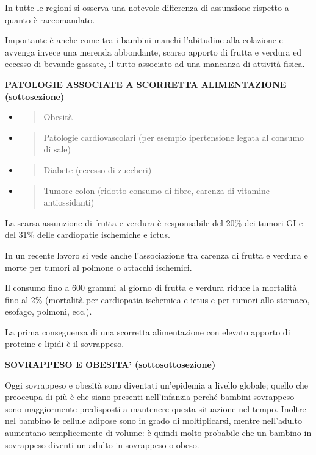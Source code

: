 \documentclass[]{article}
\begin{document}
In tutte le regioni si osserva una notevole differenza di assunzione
rispetto a quanto è raccomandato.

Importante è anche come tra i bambini manchi l'abitudine alla colazione
e avvenga invece una merenda abbondante, scarso apporto di frutta e
verdura ed eccesso di bevande gassate, il tutto associato ad una
mancanza di attività fisica.

\textbf{PATOLOGIE ASSOCIATE A SCORRETTA ALIMENTAZIONE (sottosezione)}

\begin{itemize}
\item
  \begin{quote}
  Obesità
  \end{quote}
\item
  \begin{quote}
  Patologie cardiovascolari (per esempio ipertensione legata al consumo
  di sale)
  \end{quote}
\item
  \begin{quote}
  Diabete (eccesso di zuccheri)
  \end{quote}
\item
  \begin{quote}
  Tumore colon (ridotto consumo di fibre, carenza di vitamine
  antiossidanti)
  \end{quote}
\end{itemize}

La scarsa assunzione di frutta e verdura è responsabile del 20\% dei
tumori GI e del 31\% delle cardiopatie ischemiche e ictus.

In un recente lavoro si vede anche l'associazione tra carenza di frutta
e verdura e morte per tumori al polmone o attacchi ischemici.

Il consumo fino a 600 grammi al giorno di frutta e verdura riduce la
mortalità fino al 2\% (mortalità per cardiopatia ischemica e ictus e per
tumori allo stomaco, esofago, polmoni, ecc.).

La prima conseguenza di una scorretta alimentazione con elevato apporto
di proteine e lipidi è il sovrappeso.

\textbf{SOVRAPPESO E OBESITA' (sottosottosezione)}

Oggi sovrappeso e obesità sono diventati un'epidemia a livello globale;
quello che preoccupa di più è che siano presenti nell'infanzia perché
bambini sovrappeso sono maggiormente predisposti a mantenere questa
situazione nel tempo. Inoltre nel bambino le cellule adipose sono in
grado di moltiplicarsi, mentre nell'adulto aumentano semplicemente di
volume: è quindi molto probabile che un bambino in sovrappeso diventi un
adulto in sovrappeso o obeso.
\end{document}
